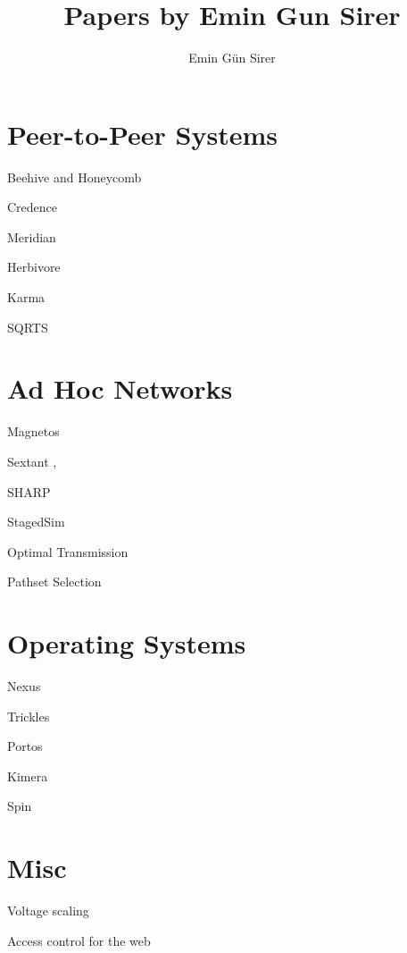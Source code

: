 \documentclass[10pt]{article}
\title{Papers by Emin Gun Sirer}
\author{Emin G\"un Sirer}
\date{}
\begin{document}
\maketitle

\section{Peer-to-Peer Systems}

  Beehive and Honeycomb \cite{corona:login,corona,heuristicsharmful,cobweb:tr,me:rss,me:dns,codons,beehive,corsso,beehive:tr}

  Credence \cite{credence,credence:p2pecon,credence:tr}

  Meridian \cite{closestnode,meridian,meridian:tr:extended,meridian:tr}

  Herbivore \cite{herbivore,herbivore:tr,cliquenet}

  Karma \cite{karma}

  SQRTS \cite{sqrts}

\section{Ad Hoc Networks}

  Magnetos \cite{magnetos,magnetos:motivation,magnetos:tr}

  Sextant \cite{sextant},

  SHARP \cite{sharp}

  StagedSim \cite{stagedsim,stagedsim:wcs}

  Optimal Transmission \cite{optxmit}

  Pathset Selection \cite{pathset}

\section{Operating Systems}

  Nexus \cite{dan:paramselect}

  Trickles \cite{trickles}

  Portos \cite{portos}

  Kimera \cite{kimera:scp,kimera,kimera:dsl,kimera:star,kimera:sas,kimera:wcsss,kimera:esigops,kimera:tr}

  Spin \cite{sysprogm3,strands,spin:wcsss2,spin:wcsss1,spin,spin:protection,spin:osr,spin:esigops,spin:tr}

\section{Misc}

 Voltage scaling \cite{voltagescaling}

 Access control for the web \cite{webacl}



\pagebreak
\end{document}
